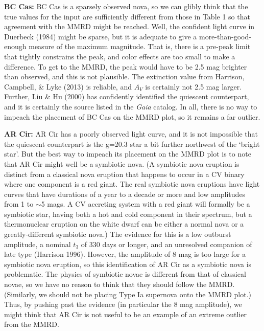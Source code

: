 \documentclass[a4paper,fleqn,usenatbib]{mnras}
\begin{document}
	{\bf BC Cas:}  BC Cas is a sparsely observed nova, so we can glibly think that the true values for the input are sufficiently different from those in Table 1 so that agreement with the MMRD might be reached.  Well, the confident light curve in Duerbeck (1984) might be sparse, but it is adequate to give a more-than-good-enough measure of the maximum magnitude.  That is, there is a pre-peak limit that tightly constrains the peak, and color effects are too small to make a difference.  To get to the MMRD, the peak would have to be 2.5 mag brighter than observed, and this is not plausible.  The extinction value from Harrison, Campbell, \& Lyke (2013) is reliable, and $A_V$ is certainly not 2.5 mag larger.  Further, Liu \& Hu (2000) has confidently identified the quiescent counterpart, and it is certainly the source listed in the {\it Gaia} catalog.  In all, there is no way to impeach the placement of BC Cas on the MMRD plot, so it remains a far outlier.

	{\bf AR Cir:}  AR Cir has a poorly observed light curve, and it is not impossible that the quiescent counterpart is the g=20.3 star a bit further northwest of the `bright star'.  But the best way to impeach its placement on the MMRD plot is to note that AR Cir might well be a symbiotic nova.  (A symbiotic nova eruption is distinct from a classical nova eruption that happens to occur in a CV binary where one component is a red giant.  The real symbiotic nova eruptions have light curves that have durations of a year to a decade or more and low amplitudes from 1 to $\sim$5 mags.  A CV accreting system with a red giant will formally be a symbiotic star, having both a hot and cold component in their spectrum, but a thermonuclear eruption on the white dwarf  can be either a normal nova or a greatly-different symbiotic nova.)  The evidence for this is a low outburst amplitude, a nominal $t_3$ of 330 days or longer, and an unresolved companion of late type (Harrison 1996).  However, the amplitude of 8 mag is too large for a symbiotic nova eruption, so this identification of AR Cir as a symbiotic nova is problematic.  The physics of symbiotic novae is different from that of classical novae, so we have no reason to think that they should follow the MMRD.  (Similarly, we should not be placing Type Ia supernova onto the MMRD plot.)  Thus, by pushing past the evidence (in particular the 8 mag amplitude), we might think that AR Cir is not useful to be an example of an extreme outlier from the MMRD.
\end{document}

